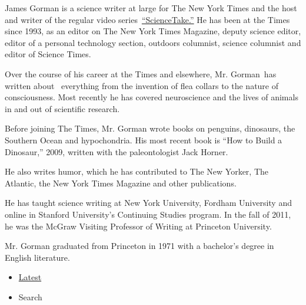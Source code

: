 James Gorman is a science writer at large for The New York Times and the
host and writer of the regular video
series~\href{https://www.nytimes3xbfgragh.onion/video/sciencetake}{``ScienceTake.''}
He has been at the Times since 1993, as an editor on The New York Times
Magazine, deputy science editor, editor of a personal technology
section, outdoors columnist, science columnist and editor of Science
Times.

Over the course of his career at the Times and elsewhere, Mr. Gorman~has
written about ~everything from the invention of flea collars to the
nature of consciousness. Most recently he has covered neuroscience and
the lives of animals in and out of scientific research.

Before joining The Times, Mr. Gorman wrote books on penguins, dinosaurs,
the Southern Ocean and hypochondria. His most recent book is ``How to
Build a Dinosaur,'' 2009, written with the paleontologist Jack Horner.

He also writes humor, which he has contributed to The New Yorker, The
Atlantic, the New York Times Magazine and other publications.

He has taught science writing at New York University, Fordham University
and online in Stanford University's Continuing Studies program. In the
fall of 2011, he was the McGraw Visiting Professor of Writing at
Princeton University.

Mr. Gorman graduated from Princeton in 1971 with a bachelor's degree in
English literature.

\begin{itemize}
\tightlist
\item
  \protect\hyperlink{stream-panel}{Latest}
\item
  Search
\end{itemize}

